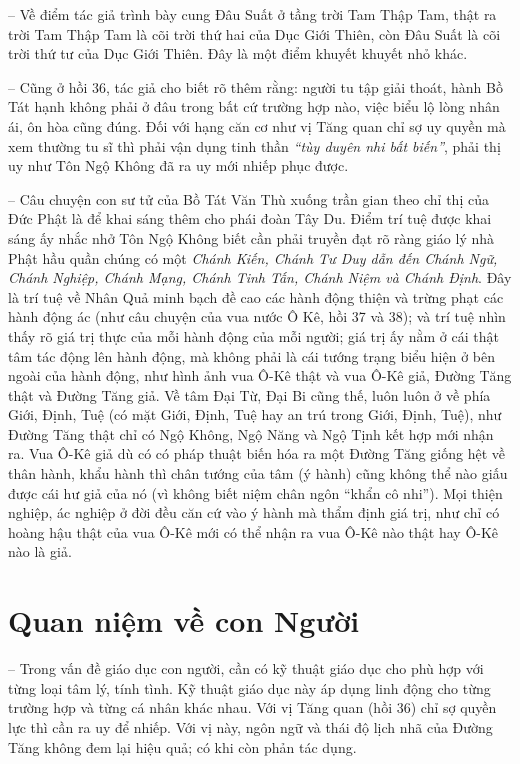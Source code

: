 -- Về điểm tác giả trình bày cung Đâu Suất ở tầng trời Tam Thập Tam, thật ra trời Tam Thập Tam là cõi trời thứ hai của Dục Giới Thiên, còn Đâu Suất là cõi trời thứ tư của Dục Giới Thiên. Đây là một điểm khuyết khuyết nhỏ khác.

-- Cũng ở hồi 36, tác giả cho biết rõ thêm rằng: người tu tập giải thoát, hành Bồ Tát hạnh không phải ở đâu trong bất cứ trường hợp nào, việc biểu lộ lòng nhân ái, ôn hòa cũng đúng. Đối với hạng căn cơ như vị Tăng quan chỉ sợ uy quyền mà xem thường tu sĩ thì phải vận dụng tinh thần \emph{``tùy duyên nhi bất biến''}, phải thị uy như Tôn Ngộ Không đã ra uy mới nhiếp phục được.

-- Câu chuyện con sư tử của Bồ Tát Văn Thù xuống trần gian theo chỉ thị của Đức Phật là để khai sáng thêm cho phái đoàn Tây Du. Điểm trí tuệ được khai sáng ấy nhắc nhở Tôn Ngộ Không biết cần phải truyền đạt rõ ràng giáo lý nhà Phật hầu quần chúng có một \emph{Chánh Kiến, Chánh Tư Duy dẫn đến Chánh Ngữ, Chánh Nghiệp, Chánh Mạng, Chánh Tinh Tấn, Chánh Niệm và Chánh Định}. Đây là trí tuệ về Nhân Quả minh bạch đề cao các hành động thiện và trừng phạt các hành động ác (như câu chuyện của vua nước Ô Kê, hồi 37 và 38); và trí tuệ nhìn thấy rõ giá trị thực của mỗi hành động của mỗi người; giá trị ấy nằm ở cái thật tâm tác động lên hành động, mà không phải là cái tướng trạng biểu hiện ở bên ngoài của hành động, như hình ảnh vua Ô-Kê thật và vua Ô-Kê giả, Đường Tăng thật và Đường Tăng giả. Về tâm Đại Từ, Đại Bi cũng thế, luôn luôn ở về phía Giới, Định, Tuệ (có mặt Giới, Định, Tuệ hay an trú trong Giới, Định, Tuệ), như Đường Tăng thật chỉ có Ngộ Không, Ngộ Năng và Ngộ Tịnh kết hợp mới nhận ra. Vua Ô-Kê giả dù có có pháp thuật biến hóa ra một Đường Tăng giống hệt về thân hành, khẩu hành thì chân tướng của tâm (ý hành) cũng không thể nào giấu được cái hư giả của nó (vì không biết niệm chân ngôn ``khẩn cô nhi''). Mọi thiện nghiệp, ác nghiệp ở đời đều căn cứ vào ý hành mà thẩm định giá trị, như chỉ có hoàng hậu thật của vua Ô-Kê mới có thể nhận ra vua Ô-Kê nào thật hay Ô-Kê nào là giả.

\section{Quan niệm về con Người} %
\label{sec:36_37_con_nguoi}

-- Trong vấn đề giáo dục con người, cần có kỹ thuật giáo dục cho phù hợp với từng loại tâm lý, tính tình. Kỹ thuật giáo dục này áp dụng linh động cho từng trường hợp và từng cá nhân khác nhau. Với vị Tăng quan (hồi 36) chỉ sợ quyền lực thì cần ra uy để nhiếp. Với vị này, ngôn ngữ và thái độ lịch nhã của Đường Tăng không đem lại hiệu quả; có khi còn phản tác dụng.

